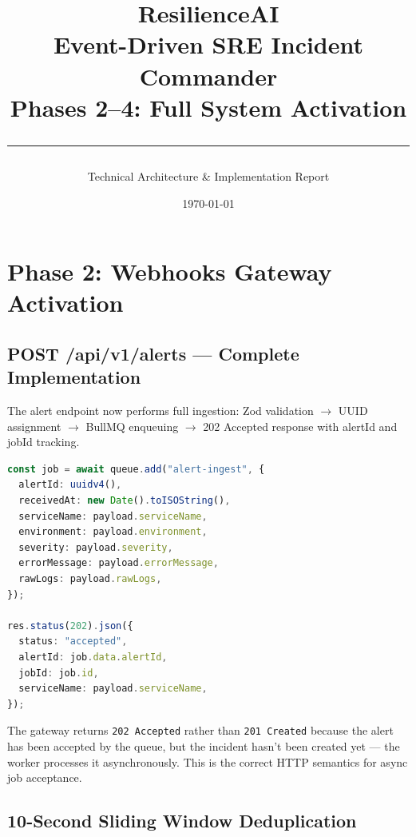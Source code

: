 \documentclass[11pt,a4paper]{article}
\title{{\Huge \textbf{ResilienceAI}}\\[0.3cm]{\Large Event-Driven SRE Incident Commander}\\[0.5cm]{\large \textcolor{primary}{\textbf{Phases 2--4: Full System Activation}}}\\[0.3cm]\rule{0.6\textwidth}{1pt}}
\author{Technical Architecture \& Implementation Report}
\date{\today}
\begin{document}
\maketitle
\thispagestyle{empty}
\newpage
\tableofcontents
\newpage

\section{Phase 2: Webhooks Gateway Activation}

\subsection{POST /api/v1/alerts — Complete Implementation}

The alert endpoint now performs full ingestion: Zod validation $\rightarrow$ UUID assignment $\rightarrow$ BullMQ enqueuing $\rightarrow$ 202 Accepted response with alertId and jobId tracking.

\begin{lstlisting}[language=TypeScript, caption=Alert ingestion flow]
const job = await queue.add("alert-ingest", {
  alertId: uuidv4(),
  receivedAt: new Date().toISOString(),
  serviceName: payload.serviceName,
  environment: payload.environment,
  severity: payload.severity,
  errorMessage: payload.errorMessage,
  rawLogs: payload.rawLogs,
});

res.status(202).json({
  status: "accepted",
  alertId: job.data.alertId,
  jobId: job.id,
  serviceName: payload.serviceName,
});
\end{lstlisting}

\begin{decisionbox}
The gateway returns \texttt{202 Accepted} rather than \texttt{201 Created} because the alert
has been accepted by the queue, but the incident hasn't been created yet — the worker
processes it asynchronously. This is the correct HTTP semantics for async job acceptance.
\end{decisionbox}

\subsection{10-Second Sliding Window Deduplication}
\end{document}
